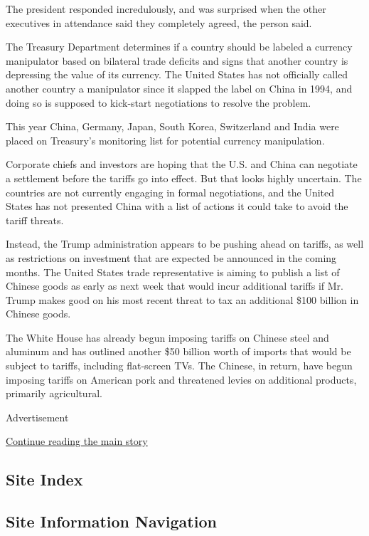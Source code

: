 The president responded incredulously, and was surprised when the other
executives in attendance said they completely agreed, the person said.

The Treasury Department determines if a country should be labeled a
currency manipulator based on bilateral trade deficits and signs that
another country is depressing the value of its currency. The United
States has not officially called another country a manipulator since it
slapped the label on China in 1994, and doing so is supposed to
kick-start negotiations to resolve the problem.

This year China, Germany, Japan, South Korea, Switzerland and India were
placed on Treasury's monitoring list for potential currency
manipulation.

Corporate chiefs and investors are hoping that the U.S. and China can
negotiate a settlement before the tariffs go into effect. But that looks
highly uncertain. The countries are not currently engaging in formal
negotiations, and the United States has not presented China with a list
of actions it could take to avoid the tariff threats.

Instead, the Trump administration appears to be pushing ahead on
tariffs, as well as restrictions on investment that are expected be
announced in the coming months. The United States trade representative
is aiming to publish a list of Chinese goods as early as next week that
would incur additional tariffs if Mr. Trump makes good on his most
recent threat to tax an additional \$100 billion in Chinese goods.

The White House has already begun imposing tariffs on Chinese steel and
aluminum and has outlined another \$50 billion worth of imports that
would be subject to tariffs, including flat-screen TVs. The Chinese, in
return, have begun imposing tariffs on American pork and threatened
levies on additional products, primarily agricultural.

Advertisement

\protect\hyperlink{after-bottom}{Continue reading the main story}

\hypertarget{site-index}{%
\subsection{Site Index}\label{site-index}}

\hypertarget{site-information-navigation}{%
\subsection{Site Information
Navigation}\label{site-information-navigation}}

